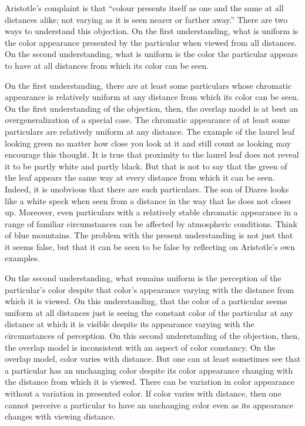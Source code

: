 Aristotle's complaint is that ``colour presents itself as one and the same at all distances alike; not varying as it is seen nearer or farther away.'' There are two ways to understand this objection. On the first understanding, what is uniform is the color appearance presented by the particular when viewed from all distances. On the second understanding, what is uniform is the color the particular appears to have at all distances from which its color can be seen.

On the first understanding, there are at least some particulars whose chromatic appearance is relatively uniform at any distance from which its color can be seen. On the first understanding of the objection, then, the overlap model is at best an overgeneralization of a special case. The chromatic appearance of at least some particulars are relatively uniform at any distance. The example of the laurel leaf looking green no matter how close you look at it and still count as looking may encourage this thought. It is true that proximity to the laurel leaf does not reveal it to be partly white and partly black. But that is not to say that the green of the leaf appears the same way at every distance from which it can be seen. Indeed, it is unobvious that there are such particulars. The son of Diares looks like a white speck when seen from a distance in the way that he does not closer up. Moreover, even particulars with a relatively stable chromatic appearance in a range of familiar circumstances can be affected by atmospheric conditions. Think of blue mountains. The problem with the present understanding is not just that it seems false, but that it can be seen to be false by reflecting on Aristotle's own examples. 

On the second understanding, what remains uniform is the perception of the particular's color despite that color's appearance varying with the distance from which it is viewed. On this understanding, that the color of a particular seems uniform at all distances just is seeing the constant color of the particular at any distance at which it is visible despite its appearance varying with the circumstances of perception. On this second understanding of the objection, then, the overlap model is inconsistent with an aspect of color constancy. On the overlap model, color varies with distance. But one can at least sometimes see that a particular has an unchanging color despite its color appearance changing with the distance from which it is viewed. There can be variation in color appearance without a variation in presented color. If color varies with distance, then one cannot perceive a particular to have an unchanging color even as its appearance changes with viewing distance.

